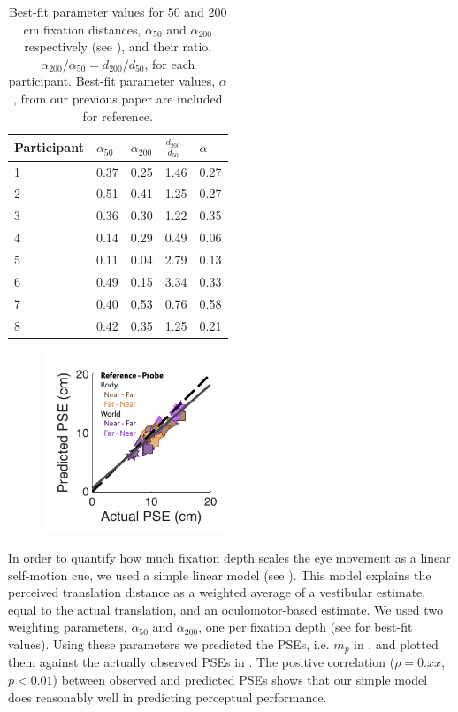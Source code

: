 \begin{table}
    \begin{tabular}{l|lll|l}
	Participant & $\alpha_{50}$ & $\alpha_{200}$ & $\frac{d_{200}}{d_{50}}$ & $\alpha$ \\
    \hline
	1 & 0.37 & 0.25 & 1.46 & 0.27 \\
	2 & 0.51 & 0.41 & 1.25 & 0.27 \\
	3 & 0.36 & 0.30 & 1.22 & 0.35 \\
	4 & 0.14 & 0.29 & 0.49 & 0.06 \\
	5 & 0.11 & 0.04 & 2.79 & 0.13 \\
	6 & 0.49 & 0.15 & 3.34 & 0.33\\
	7 & 0.40 & 0.53 & 0.76 & 0.58 \\
	8 & 0.42 & 0.35 & 1.25 & 0.21 \\
    \end{tabular}

    \caption{Best-fit parameter values for 50 and 200 \si{\centi\metre} fixation distances, $\alpha_{50}$ and $\alpha_{200}$ respectively (see ), and their ratio, $\alpha_{200} / \alpha_{50} = d_{200} / d_{50}$, for each participant. Best-fit parameter values, $\alpha$, from our previous paper \protect\cite{clemens2015a} are included for reference.}

    \label{p4:tab2}
\end{table}

\begin{figure}
    \includegraphics[width=0.5\textwidth]{src/paper4/p4_figure4.pdf}

	\caption{}
	\label{p4:fig4}
\end{figure}

In order to quantify how much fixation depth scales the eye movement as a linear self-motion cue, we used a simple linear model (see ). This model explains the perceived translation distance as a weighted average of a vestibular estimate, equal to the actual translation, and an oculomotor-based estimate. 
We used two weighting parameters, $\alpha_{50}$ and $\alpha_{200}$, one per fixation depth (see  for best-fit values). Using these parameters we predicted the PSEs, i.e. $m_p$ in , and plotted them against the actually observed PSEs in . The positive correlation ($\rho = 0.xx$, $p < 0.01$) between observed and predicted PSEs shows that our simple model does reasonably well in predicting perceptual performance.

